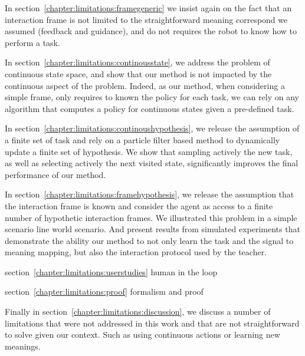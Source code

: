 In section~\ref{chapter:limitations:framegeneric} we insist again on the fact that an interaction frame is not limited to the straightforward meaning correspond we assumed (feedback and guidance), and do not requires the robot to know how to perform a task.

In section~\ref{chapter:limitations:continousstate}, we address the problem of continuous state space, and show that our method is not impacted by the continuous aspect of the problem. Indeed, as our method, when considering a simple frame, only requires to known the policy for each task, we can rely on any algorithm that computes a policy for continuous states given a pre-defined task.

In section~\ref{chapter:limitations:continoushypothesis}, we release the assumption of a finite set of task and rely on a particle filter based method to dynamically update a finite set of hypothesis. We show that sampling actively the new task, as well as selecting actively the next visited state, significantly improves the final performance of our method.

In section~\ref{chapter:limitations:framehypothesis}, we release the assumption that the interaction frame is known and consider the agent as access to a finite number of hypothetic interaction frames. We illustrated this problem in a simple scenario line world scenario. And present results from simulated experiments that demonstrate the ability our method to not only learn the task and the signal to meaning mapping, but also the interaction protocol used by the teacher.

section~\ref{chapter:limitations:userstudies}
human in the loop

section~\ref{chapter:limitations:proof}
formalism and proof


Finally in section~\ref{chapter:limitations:discussion}, we discuss a number of limitations that were not addressed in this work and that are not straightforward to solve given our context. Such as using continuous actions or learning new meanings.

% 
% 
% 
% 
% 
% 
% 
% 


